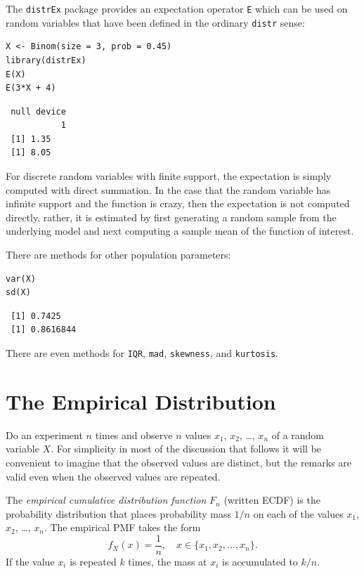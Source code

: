 \documentclass[captions=tableheading]{scrbook}
\begin{document}
The \texttt{distrEx} package provides an expectation operator \texttt{E} which can be used on random variables that have been defined in the ordinary \texttt{distr} sense:


\begin{verbatim}
X <- Binom(size = 3, prob = 0.45)
library(distrEx)
E(X)
E(3*X + 4)
\end{verbatim}

\begin{verbatim}
 null device 
           1
 [1] 1.35
 [1] 8.05
\end{verbatim}

For discrete random variables with finite support, the expectation is simply computed with direct summation. In the case that the random variable has infinite support and the function is crazy, then the expectation is not computed directly, rather, it is estimated by first generating a random sample from the underlying model and next computing a sample mean of the function of interest. 

There are methods for other population parameters:


\begin{verbatim}
var(X)
sd(X)
\end{verbatim}

\begin{verbatim}
 [1] 0.7425
 [1] 0.8616844
\end{verbatim}

There are even methods for \texttt{IQR}, \texttt{mad}, \texttt{skewness}, and \texttt{kurtosis}.
\section{The Empirical Distribution}
\label{sec-5-5}

\label{sec:empirical-distribution}

Do an experiment \(n\) times and observe \(n\) values \(x_{1}\), \(x_{2}\), \ldots{}, \(x_{n}\) of a random variable \(X\). For simplicity in most of the discussion that follows it will be convenient to imagine that the observed values are distinct, but the remarks are valid even when the observed values are repeated. 

\begin{defn}
The \emph{empirical cumulative distribution function} \(F_{n}\) (written ECDF) is the probability distribution that places probability mass \(1/n\) on each of the values \(x_{1}\), \(x_{2}\), \ldots{}, \(x_{n}\). The empirical PMF takes the form
\begin{equation} 
f_{X}(x)=\frac{1}{n},\quad x\in \{ x_{1},x_{2},...,x_{n} \}.
\end{equation}
If the value \(x_{i}\) is repeated \(k\) times, the mass at \(x_{i}\) is accumulated to \(k/n\).
\end{defn}
\end{document}
